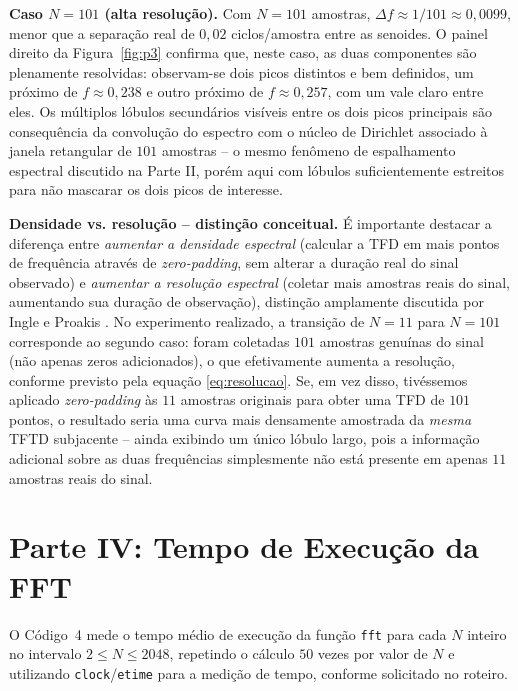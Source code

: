 \documentclass[tcc]{classe_uftex/uftex}
\begin{document}
\textbf{Caso $N=101$ (alta resolução).} Com $N=101$ amostras, $\Delta f \approx 1/101 \approx 0{,}0099$, menor que a separação real de $0{,}02$ ciclos/amostra entre as senoides. O painel direito da Figura~\ref{fig:p3} confirma que, neste caso, as duas componentes são plenamente resolvidas: observam-se dois picos distintos e bem definidos, um próximo de $f \approx 0{,}238$ e outro próximo de $f \approx 0{,}257$, com um vale claro entre eles. Os múltiplos lóbulos secundários visíveis entre os dois picos principais são consequência da convolução do espectro com o núcleo de Dirichlet associado à janela retangular de $101$ amostras -- o mesmo fenômeno de espalhamento espectral discutido na Parte II, porém aqui com lóbulos suficientemente estreitos para não mascarar os dois picos de interesse.

\textbf{Densidade vs. resolução -- distinção conceitual.} É importante destacar a diferença entre \emph{aumentar a densidade espectral} (calcular a TFD em mais pontos de frequência através de \emph{zero-padding}, sem alterar a duração real do sinal observado) e \emph{aumentar a resolução espectral} (coletar mais amostras reais do sinal, aumentando sua duração de observação), distinção amplamente discutida por Ingle e Proakis \cite{ingle2017}. No experimento realizado, a transição de $N=11$ para $N=101$ corresponde ao segundo caso: foram coletadas $101$ amostras genuínas do sinal (não apenas zeros adicionados), o que efetivamente aumenta a resolução, conforme previsto pela equação \eqref{eq:resolucao}. Se, em vez disso, tivéssemos aplicado \emph{zero-padding} às $11$ amostras originais para obter uma TFD de $101$ pontos, o resultado seria uma curva mais densamente amostrada da \emph{mesma} TFTD subjacente -- ainda exibindo um único lóbulo largo, pois a informação adicional sobre as duas frequências simplesmente não está presente em apenas $11$ amostras reais do sinal.

\section{Parte IV: Tempo de Execução da FFT}

O Código~4 mede o tempo médio de execução da função \texttt{fft} para cada $N$ inteiro no intervalo $2 \leq N \leq 2048$, repetindo o cálculo $50$ vezes por valor de $N$ e utilizando \texttt{clock}/\texttt{etime} para a medição de tempo, conforme solicitado no roteiro.


\end{document}
